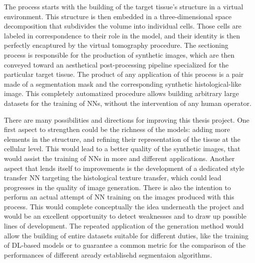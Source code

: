 The process  starts with the building of the target tissue's structure in a virtual environment. This structure is then embedded in a three-dimensional space decomposition that subdivides the volume into individual cells. Those cells are labeled in correspondence to their role in the model, and their identity is then perfectly encaptured by the virtual tomography procedure. The sectioning process is responsible for the production of synthetic images, which are then conveyed toward an aesthetical post-processing pipeline specialized for the particular target tissue. The product of any application of this process is a pair made of a segmentation mask and the corresponding synthetic histological-like image. This completely automatized procedure allows building arbitrary large datasets for the training of NNs, without the intervention of any human operator.

There are many possibilities and directions for improving this thesis project. One first aspect to strengthen could be the richness of the models: adding more elements in the structure, and refining their representation of the tissue at the cellular level. This would lead to a better quality of the synthetic images, that would assist the training of NNs in more and different applications. Another aspect that lends itself to improvements is the development of a dedicated style transfer NN targeting the histological texture transfer, which could lead progresses in the quality of image generation. There is also the intention to perform an actual attempt of NN training on the images produced with this process. This would complete conceptually the idea underneath the project and would be an excellent opportunity to detect weaknesses and to draw up possible lines of development. The repeated application of the generation method would allow the building of entire datasets suitable for different duties, like the training of DL-based models or to guarantee a common metric for the comparison of the performances of different aready establisehd segmentaion algorithms.
